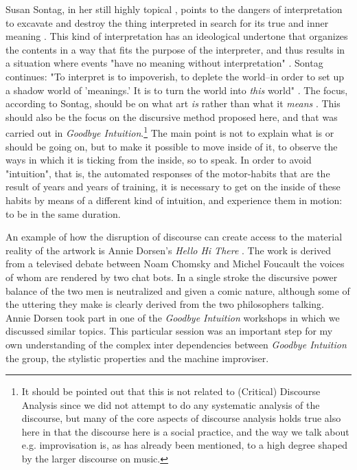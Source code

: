 \documentclass[11pt]{article}
\begin{document}
Susan Sontag, in her still highly topical , points to the dangers of interpretation to excavate and destroy the thing interpreted in search for its true and inner meaning \citep[ch. 3]{Sontag1986}. This kind of interpretation has an ideological undertone that organizes the contents in a way that fits the purpose of the interpreter, and thus results in a situation where events "have no meaning without interpretation" \citep[ch. 3]{Sontag1986}. Sontag continues: "To interpret is to impoverish, to deplete the world--in order to set up a shadow world of 'meanings.' It is to turn the world into \emph{this} world" \citep[Ch. 4]{Sontag1986}. The focus, according to Sontag, should be on what art \emph{is} rather than what it \emph{means} \citep[Ch. 9]{Sontag1986}. This should also be the focus on the discursive method proposed here, and that was carried out in \emph{Goodbye Intuition}.\footnote{It should be pointed out that this is not related to (Critical) Discourse Analysis since we did not attempt to do any systematic analysis of the discourse, but many of the core aspects of discourse analysis holds true also here in that the discourse here is a social practice, and the way we talk about e.g. improvisation is, as has already been mentioned, to a high degree shaped by the larger discourse on music.} The main point is not to explain what is or should be going on, but to make it possible to move inside of it, to observe the ways in which it is ticking from the inside, so to speak. In order to avoid "intuition", that is, the automated responses of the motor-habits that are the result of years and years of training, it is necessary to get on the inside of these habits by means of a different kind of intuition, and experience them in motion: to be in the same duration.

An example of how the disruption of discourse can create access to the material reality of the artwork is Annie Dorsen's \emph{Hello Hi There} \citep{dorsen2010}. The work is derived from a televised debate between Noam Chomsky and Michel Foucault the voices of whom are rendered by two chat bots. In a single stroke the discursive power balance of the two men is neutralized and given a comic nature, although some of the uttering they make is clearly derived from the two philosophers talking. Annie Dorsen took part in one of the \emph{Goodbye Intuition} workshops in which we discussed similar topics. This particular session was an important step for my own understanding of the complex inter dependencies between \emph{Goodbye Intuition} the group, the stylistic properties and the machine improviser.
\end{document}
